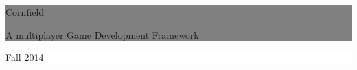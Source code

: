 %
%
%
%
	\thispagestyle{empty}

	\vspace*{\fill}

	\noindent \colorbox{gray}{
		\parbox{\textwidth}{%
			\color{white}%
			\begin{center}
				\Huge{{\selectfont Cornfield}} %
			\end{center}
			\begin{center}
			\Large{\textsf{A multiplayer Game Development Framework}}\\
			[0.5cm] %
			\small{
			}
			\end{center}
		}}
		
	\vfill


	\begin{figure}[htbp]
	\centering
	\vspace{140px}
	\end{figure}
	
	\noindent \colorbox{white}{
		\begin{minipage}[b]{6.5cm}
		\begin{center}
			\end{center}
			\vspace*{-20px}
		\end{minipage}
	} 
	\hfill  
	\colorbox{white}{ 
		\begin{minipage}[b]{3.5cm}	 
			\flushright
			{\large Fall 2014} \\
		\end{minipage}
	}

\clearpage
